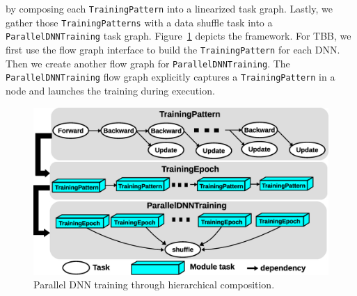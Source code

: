 \documentclass[conference]{IEEEtran}
\begin{document}
by composing each \lstinline{TrainingPattern} into a linearized task graph. 
Lastly, we gather those \lstinline{TrainingPatterns} with a data shuffle task
into a \lstinline{ParallelDNNTraining} task graph. Figure~\ref{fig::dnn_composition} 
depicts the framework. 
For TBB, we first use the flow graph interface to build the \lstinline{TrainingPattern} for each DNN. 
Then we create another flow graph for \lstinline{ParallelDNNTraining}.
The \lstinline{ParallelDNNTraining} flow graph explicitly captures a \lstinline{TrainingPattern} in a node 
and launches the training during execution. 

\begin{figure}[!h]
  \centering
  \includegraphics[width=1.\columnwidth]{Fig/parallel_dnn.eps}
  \caption{
    Parallel DNN training through hierarchical composition.
  }
  \label{fig::dnn_composition}
\end{figure}
\end{document}

